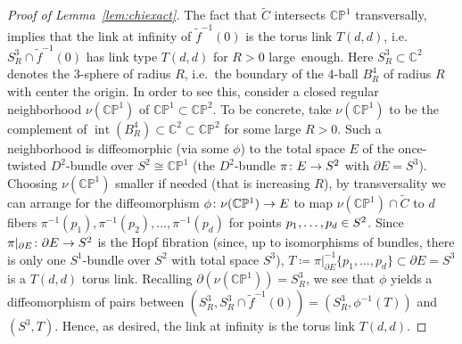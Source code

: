 \documentclass[10pt,a4paper]{article}
\theoremstyle{definition}
\numberwithin{equation}{section}
\DeclareMathOperator{\intt}{int}
\newcommand*\C{\mathbb{C}}
\renewcommand*\P{\mathbb{P}}
\renewcommand*{\to}{\mathchoice{\longrightarrow}{\rightarrow}{\rightarrow}{\rightarrow}}
\let\oldin\in
\renewcommand{\in}{\mathchoice{\oldin}{\oldin}{\,\oldin\,}{\,\oldin\,}}
\begin{document}
\begin{proof}[Proof of Lemma~\ref{lem:chiexact}]
The fact that $\widetilde{C}$ intersects $\C\P^1$ transversally, implies that the link at infinity of $\widetilde{f}^{-1}(0)$ is the torus link $T(d,d)$, i.e.~$S^3_R\cap \widetilde{f}^{-1}(0)$ has link type $T(d,d)$ for $R>0$ large~enough. Here $S^3_R\subset \C^2$ denotes the $3$-sphere of radius $R$, i.e.~the boundary of the $4$-ball $B^4_R$ of radius $R$ with center the origin. In order to see this, consider a closed regular neighborhood $\nu(\C\P^1)$ of $\C\P^1\subset\C\P^2$. To be concrete, take $\nu(\C\P^1)$ to be the complement of $\intt(B^4_R)\subset\C^2\subset\C\P^2$ for some large $R>0$. Such a neighborhood is diffeomorphic (via some $\phi$) to the total space $E$ of the once-twisted $D^2$-bundle over $S^2\cong \C\P^1$ (the $D^2$-bundle $\pi\colon E\to S^2$ with $\partial E=S^3$). Choosing $\nu(\C\P^1)$ smaller if needed (that is increasing $R$), by transversality we can arrange for the diffeomorphism $\phi\colon \nu(\C\P^1)\to E$ to map $\nu(\C\P^1)\cap \widetilde{C}$ to $d$ fibers $\pi^{-1}(p_1),\pi^{-1}(p_2),\dots,\pi^{-1}(p_d)$ for points $p_1,\dots,p_d\in S^2$. Since $\pi|_{\partial E}\colon \partial E\to S^2$ is the Hopf fibration (since, up to isomorphisms of bundles, there is only one $S^1$-bundle over $S^2$ with total space $S^3$), $T\coloneqq\pi|_{\partial E}^{-1}\{p_1,\dots,p_d\}\subset \partial E=S^3$ is a $T(d,d)$ torus link. Recalling 
${\partial(\nu(\C\P^1))=S^3_R}$, we see that $\phi$ yields a diffeomorphism of pairs between $(S^3_R,S^3_R\cap \widetilde{f}^{-1}(0))=(S^3_R,\phi^{-1}(T))$ and $(S^3, T)$. Hence, as desired, the link at infinity is the torus link $T(d,d)$.


\end{proof}
\end{document}
